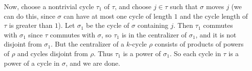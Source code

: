 \documentclass[12pt]{article}
\begin{document}
Now, choose a nontrivial cycle $\tau_1$ of $\tau$, and choose $j\in\tau$ such that $\sigma$ moves $j$ (we can do this, since $\sigma$ can have at most one cycle of length $1$ and the cycle length of $\tau$ is greater than $1$). Let $\sigma_1$ be the cycle of $\sigma$ containing $j$. Then $\tau_1$ commutes with $\sigma_1$ since $\tau$ commutes with $\sigma$, so $\tau_1$ is in the centralizer of $\sigma_1$, and it is not disjoint from $\sigma_1$. But the centralizer of a $k$-cycle $\rho$ consists of products of powers of $\rho$ and cycles disjoint from $\rho$. Thus $\tau_1$ is a power of $\sigma_1$. So each cycle in $\tau$ is a power of a cycle in $\sigma$, and we are done.

\end{document}
